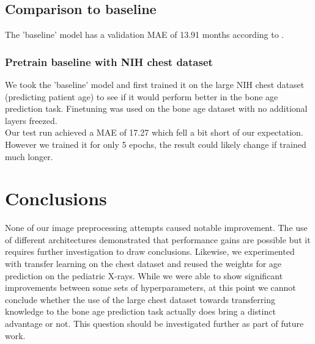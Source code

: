 \documentclass[10pt,twocolumn,letterpaper]{article}
\begin{document}
\begin{table}[H]
\centering
\caption{Classification versus Regression}
\label{tab:classificationRegression}
\label{table:classvsreg}
\end{table}


\subsection{Comparison to baseline}
The 'baseline' model has a validation MAE of 13.91 months according to \cite{kaggleboneage}.

\subsubsection{Pretrain baseline \cite{kaggleboneage} with NIH chest dataset}
We took the 'baseline' model and first trained it on the large NIH chest dataset (predicting patient age) to see if it would perform better in the bone age prediction task. Finetuning was used on the bone age dataset with no additional layers freezed. \\
Our test run achieved a MAE of 17.27 which fell a bit short of our expectation. However we trained it for only 5 epochs, the result could likely change if trained much longer.

\section{Conclusions}
None of our image preprocessing attempts caused notable improvement. The use of different architectures demonstrated that performance gains are possible but it requires further investigation to draw conclusions. Likewise, we experimented with transfer learning on the chest dataset and reused the weights for age prediction on the pediatric X-rays. While we were able to show significant improvements between some sets of hyperparameters, at this point we cannot conclude whether the use of the large chest dataset towards transferring knowledge to the bone age prediction task actually does bring a distinct advantage or not. This question should be investigated further as part of future work.
\end{document}
